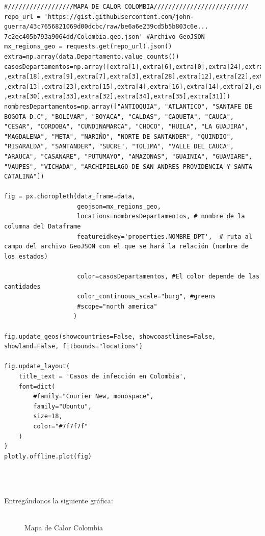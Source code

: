 \documentclass[conference,compsoc,onecolumn]{IEEEtran}
\begin{document}
\begin{lstlisting}
#//////////////////MAPA DE CALOR COLOMBIA//////////////////////////
repo_url = 'https://gist.githubusercontent.com/john-guerra/43c7656821069d00dcbc/raw/be6a6e239cd5b5b803c6e...
7c2ec405b793a9064dd/Colombia.geo.json' #Archivo GeoJSON
mx_regions_geo = requests.get(repo_url).json()
extra=np.array(data.Departamento.value_counts())
casosDepartamentos=np.array([extra[1],extra[6],extra[0],extra[24],extra[17],extra[19],extra[21]...
,extra[18],extra[9],extra[7],extra[3],extra[28],extra[12],extra[22],extra[25],extra[10],extra[11]...
,extra[13],extra[23],extra[15],extra[4],extra[16],extra[14],extra[2],extra[29],extra[26],extra[27]...
,extra[30],extra[33],extra[32],extra[34],extra[35],extra[31]])
nombresDepartamentos=np.array(["ANTIOQUIA", "ATLANTICO", "SANTAFE DE BOGOTA D.C", "BOLIVAR", "BOYACA", "CALDAS", "CAQUETA", "CAUCA", "CESAR", "CORDOBA", "CUNDINAMARCA", "CHOCO", "HUILA", "LA GUAJIRA", "MAGDALENA", "META", "NARIÑO", "NORTE DE SANTANDER", "QUINDIO", "RISARALDA", "SANTANDER", "SUCRE", "TOLIMA", "VALLE DEL CAUCA", "ARAUCA", "CASANARE", "PUTUMAYO", "AMAZONAS", "GUAINIA", "GUAVIARE", "VAUPES", "VICHADA", "ARCHIPIELAGO DE SAN ANDRES PROVIDENCIA Y SANTA CATALINA"])

fig = px.choropleth(data_frame=data,
                    geojson=mx_regions_geo,
                    locations=nombresDepartamentos, # nombre de la columna del Dataframe
                    featureidkey='properties.NOMBRE_DPT',  # ruta al campo del archivo GeoJSON con el que se hará la relación (nombre de los estados)

                    color=casosDepartamentos, #El color depende de las cantidades
                    color_continuous_scale="burg", #greens
                    #scope="north america"
                   )

fig.update_geos(showcountries=False, showcoastlines=False, showland=False, fitbounds="locations")

fig.update_layout(
    title_text = 'Casos de infección en Colombia',
    font=dict(
        #family="Courier New, monospace",
        family="Ubuntu",
        size=18,
        color="#7f7f7f"
    )
)
plotly.offline.plot(fig)

\end{lstlisting}
\\\

Entregándonos la siguiente gráfica:
\\\

\begin{figure}[htbp]
\centering
{}
\caption{ Mapa de Calor Colombia} \label{fig:lego}
\end{figure}
\\\
\end{document}
